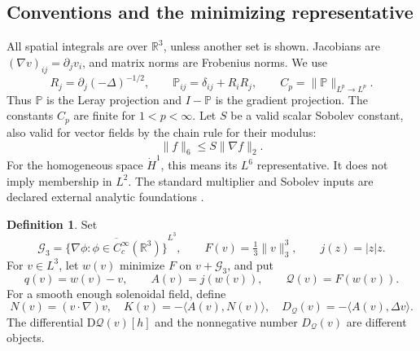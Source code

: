 \documentclass[11pt,a4paper]{article}
\theoremstyle{definition}
\newtheorem{definition}[theorem]{Definition}
\theoremstyle{remark}
\newcommand{\R}{\mathbb R}
\newcommand{\G}{\mathcal G_3}
\newcommand{\Q}{\mathcal Q}
\newcommand{\PP}{\mathbb P}
\newcommand{\norm}[1]{\lVert #1\rVert}
\newcommand{\ip}[2]{\langle #1,#2\rangle}
\numberwithin{equation}{section}
\begin{document}
\subsection{Conventions and the minimizing representative}
All spatial integrals are over \(\R^3\), unless another set is shown. Jacobians are \((\nabla v)_{ij}=\partial_jv_i\), and matrix norms are Frobenius norms. We use
\[
R_j=\partial_j(-\Delta)^{-1/2},\qquad
\PP_{ij}=\delta_{ij}+R_iR_j,
\qquad C_p=\norm{\PP}_{L^p\to L^p}.
\]
Thus \(\PP\) is the Leray projection and \(I-\PP\) is the gradient projection. The constants \(C_p\) are finite for \(1<p<\infty\). Let \(S\) be a valid scalar Sobolev constant, also valid for vector fields by the chain rule for their modulus:
\begin{equation}\label{eq:sobolev}
\norm{f}_6\le S\norm{\nabla f}_2.
\end{equation}
For the homogeneous space \(\dot H^1\), this means its \(L^6\) representative. It does not imply membership in \(L^2\). The standard multiplier and Sobolev inputs are declared external analytic foundations \cite{Stein}.

\begin{definition}
Set
\[
\G=\overline{\{\nabla\phi:\phi\in C_c^\infty(\R^3)\}}^{L^3},
\qquad F(v)=\tfrac13\norm{v}_3^3,
\qquad j(z)=|z|z.
\]
For \(v\in L^3\), let \(w(v)\) minimize \(F\) on \(v+\G\), and put
\begin{equation}\label{eq:objects}
q(v)=w(v)-v,\qquad A(v)=j(w(v)),\qquad \Q(v)=F(w(v)).
\end{equation}
For a smooth enough solenoidal field, define
\begin{equation}\label{eq:KD}
N(v)=(v\cdot\nabla)v,\quad
K(v)=-\ip{A(v)}{N(v)},\quad
D_{\Q}(v)=-\ip{A(v)}{\Delta v}.
\end{equation}
The differential \(\mathrm D\Q(v)[h]\) and the nonnegative number \(D_{\Q}(v)\) are different objects.
\end{definition}
\end{document}

